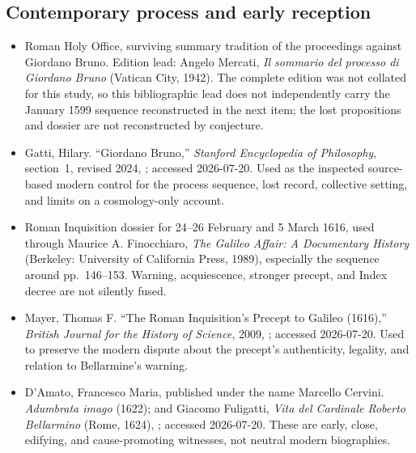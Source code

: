 \subsection{Contemporary process and early reception}

\begin{itemize}
\item Roman Holy Office, surviving summary tradition of the proceedings
against Giordano Bruno.  Edition lead: Angelo Mercati, \emph{Il sommario del
processo di Giordano Bruno} (Vatican City, 1942).  The complete edition was not
collated for this study, so this bibliographic lead does not independently
carry the January 1599 sequence reconstructed in the next item; the lost
propositions and dossier are not reconstructed by conjecture.

\item Gatti, Hilary.  ``Giordano Bruno,'' \emph{Stanford Encyclopedia of
Philosophy}, section~1, revised 2024,
; accessed
2026-07-20.  Used as the inspected source-based modern control for the process
sequence, lost record, collective setting, and limits on a cosmology-only
account.

\item Roman Inquisition dossier for 24--26 February and 5 March 1616, used
through Maurice A. Finocchiaro, \emph{The Galileo Affair: A Documentary
History} (Berkeley: University of California Press, 1989), especially the
sequence around pp.~146--153.  Warning, acquiescence, stronger precept, and
Index decree are not silently fused.

\item Mayer, Thomas F.  ``The Roman Inquisition's Precept to Galileo
(1616),'' \emph{British Journal for the History of Science}, 2009,
; accessed 2026-07-20.  Used to preserve the modern dispute about the
precept's authenticity, legality, and relation to Bellarmine's warning.

\item D'Amato, Francesco Maria, published under the name Marcello Cervini.
\emph{Adumbrata imago} (1622); and Giacomo Fuligatti, \emph{Vita del
Cardinale Roberto Bellarmino} (Rome, 1624),
; accessed 2026-07-20.  These are early, close, edifying, and
cause-promoting witnesses, not neutral modern biographies.


\end{itemize}
